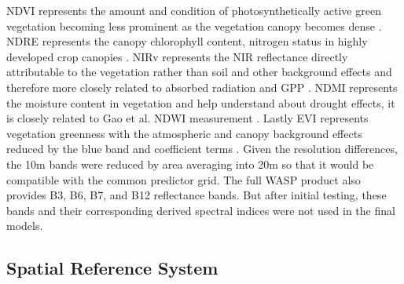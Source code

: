 NDVI represents the amount and condition of photosynthetically active green vegetation becoming less prominent as the vegetation canopy becomes dense \cite{tucker1979red}. NDRE represents the canopy chlorophyll content, nitrogen status in highly developed crop canopies \cite{barnes2000coincident}. NIRv represents the NIR reflectance directly attributable to the vegetation rather than soil and other background effects and therefore more closely related to absorbed radiation and GPP \cite{badgley2017canopy, liu2020estimating}. NDMI represents the moisture content in vegetation and help understand about drought effects, it is closely related to Gao et al. NDWI measurement \cite{gao1996ndwi}. Lastly EVI represents vegetation greenness with the atmospheric and canopy background effects reduced by the blue band and coefficient terms \cite{huete2002overview}. Given the resolution differences, the 10m bands were reduced by area averaging into 20m so that it would be compatible with the common predictor grid. The full WASP product also provides B3, B6, B7, and B12 reflectance bands. But after initial testing, these bands and their corresponding derived spectral indices were not used in the final models.

\subsection{Spatial Reference System}

